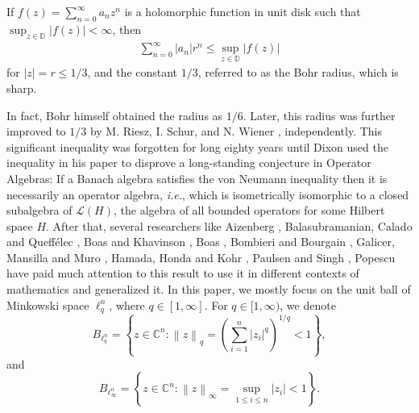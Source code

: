 \documentclass[a4paper,12pt]{amsart}
\theoremstyle{definition}
\newenvironment{customthm}[1]
  {\renewcommand\theinnercustomthm{#1}\innercustomthm}
  {\endinnercustomthm}
\newcommand{\norm}[1]{\left\lVert#1\right\rVert}
\begin{document}
\begin{customthm}{A} \cite{Bohr-1914}\label{Bohr-Thm-1914}
	If $f(z)= \sum_{n=0}^{\infty}a_n z^n$ is a holomorphic function in unit disk such that $\sup_{z\in \mathbb{D}}|f(z)|<\infty$, then 
	\begin{align}\label{eqn-003}
		\sum_{n=0}^{\infty}|a_n|r^n \leq \sup_{z\in \mathbb{D}}|f(z)|
	\end{align}
	for $|z|=r \leq 1/3$, and the constant $1/3$, referred to as the Bohr radius, which is sharp.
\end{customthm}

\noindent
In fact, Bohr himself obtained the radius as $1/6$. Later, this radius was further improved to $1/3$ by M. Riesz, I. Schur, and N. Wiener \cite{sidon-1927,tomic-1962}, independently. This significant inequality was forgotten for long eighty years until Dixon \cite{Dixon & BLMS & 1995} used the inequality in his paper to disprove a long-standing conjecture in Operator Algebras: 	If a Banach algebra satisfies the von Neumann inequality then it is necessarily an operator algebra, \textit{i.e.}, which is isometrically isomorphic to a closed subalgebra of $\mathcal{L}(H)$, the algebra of all bounded operators for some Hilbert space $H$. After that, several researchers like Aizenberg \cite{aizn-2000a,aizn-2000b,aizenberg-2001}, Balasubramanian, Calado and Queff\'{e}lec \cite{bala-studia-2006}, Boas and Khavinson \cite{boas-1997}, Boas \cite{boas-2000}, Bombieri and Bourgain \cite{bombieri-2004}, Galicer, Mansilla and Muro \cite{galicer-TAMS-2020}, Hamada, Honda and Kohr \cite{hamada-israel-2009}, Paulsen and Singh \cite{paulsen-2002}, Popescu \cite{popescu-2019} have paid much attention to this result to use it in different contexts of mathematics and generalized it. In this paper, we mostly focus on the unit ball of Minkowski space $\ell^n_q$, where $q \in [1,\infty]$. For $q \in [1,\infty)$, we denote
$$B_{\ell^n _q}= \left\{z \in \mathbb{C}^n:\norm{z}_{q}=\left(\sum_{i=1}^{n}|z_{i}|^q\right)^{1/q}<1\right\},$$ 
and 
$$B_{\ell^n _\infty}= \left\{z \in \mathbb{C}^n: \norm{z}_{\infty}=\sup _{1\leq i \leq n} |z_{i}|<1\right\}.$$
\end{document}
